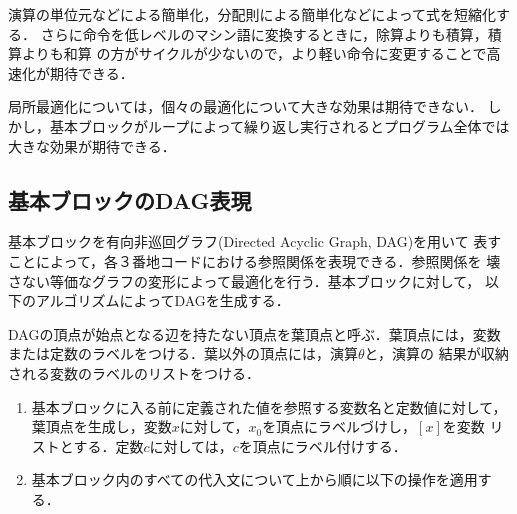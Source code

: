 \documentclass[dvipdfmx,a4j]{jbook}
\begin{document}
演算の単位元などによる簡単化，分配則による簡単化などによって式を短縮化する．
さらに命令を低レベルのマシン語に変換するときに，除算よりも積算，積算よりも和算
の方がサイクルが少ないので，より軽い命令に変更することで高速化が期待できる．

局所最適化については，個々の最適化について大きな効果は期待できない．
しかし，基本ブロックがループによって繰り返し実行されるとプログラム全体では
大きな効果が期待できる．

\subsection{基本ブロックのDAG表現}

基本ブロックを有向非巡回グラフ(Directed Acyclic Graph, DAG)を用いて
表すことによって，各３番地コードにおける参照関係を表現できる．参照関係を
壊さない等価なグラフの変形によって最適化を行う．基本ブロックに対して，
以下のアルゴリズムによってDAGを生成する．

\begin{Alg}
    DAGの頂点が始点となる辺を持たない頂点を葉頂点と呼ぶ．葉頂点には，変数
    または定数のラベルをつける．葉以外の頂点には，演算$\theta$と，演算の
    結果が収納される変数のラベルのリストをつける．
    \begin{enumerate}
        \item 基本ブロックに入る前に定義された値を参照する変数名と定数値に対して，
              葉頂点を生成し，変数$x$に対して，$x_0$を頂点にラベルづけし，$[x]$を変数
              リストとする．定数$c$に対しては，$c$を頂点にラベル付けする．
        \item 基本ブロック内のすべての代入文について上から順に以下の操作を適用する．
    \end{enumerate}
\end{Alg}
\end{document}
